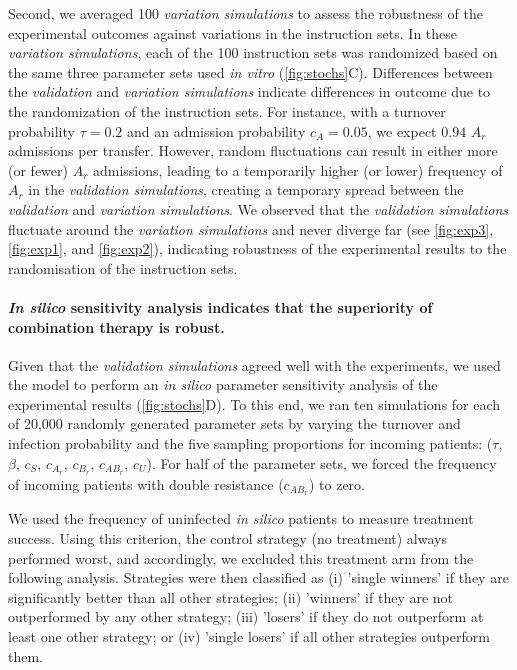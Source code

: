 Second, we averaged 100 \textit{variation simulations} to assess the robustness of the experimental outcomes against variations in the instruction sets.
In these \textit{variation simulations}, each of the 100 instruction sets was randomized based on the same three parameter sets used \textit{in vitro} (\autoref{fig:stochs}C).
Differences between the \textit{validation} and \textit{variation simulations} indicate differences in outcome due to the randomization of the instruction sets.
For instance, with a turnover probability $\tau = 0.2$ and an admission probability $c_A = 0.05$, we expect $0.94$ $A_r$ admissions per transfer. However, random fluctuations can result in either more (or fewer) $A_r$ admissions, leading to a temporarily higher (or lower) frequency of $A_r$ in the \textit{validation simulations}, creating a temporary spread between the \textit{validation} and \textit{variation simulations}.
We observed that the \textit{validation simulations} fluctuate around the \textit{variation simulations} and never diverge far (see \autoref{fig:exp3}, \autoref{fig:exp1}, and \autoref{fig:exp2}), indicating robustness of the experimental results to the randomisation of the instruction sets.

\paragraph{\textit{In silico} sensitivity analysis indicates that the superiority of combination therapy is robust.}
Given that the \textit{validation simulations} agreed well with the experiments, we used the model to perform an \textit{in silico} parameter sensitivity analysis of the experimental results (\autoref{fig:stochs}D).
To this end, we ran ten simulations for each of 20,000 randomly generated parameter sets by varying the turnover and infection probability and the five sampling proportions for incoming patients: ($\tau$, $\beta$, $c_S$, $c_{A_r}$, $c_{B_r}$, $c_{AB_r}$, $c_U$).
For half of the parameter sets, we forced the frequency of incoming patients with double resistance ($c_{AB_r}$) to zero.

We used the frequency of uninfected \textit{in silico} patients to measure treatment success.
Using this criterion, the control strategy (no treatment) always performed worst, and accordingly, we excluded this treatment arm from the following analysis.
Strategies were then classified as (i) 'single winners' if they are significantly better than all other strategies; (ii) 'winners' if they are not outperformed by any other strategy; (iii) 'losers' if they do not outperform at least one other strategy; or (iv) 'single losers' if all other strategies outperform them.

